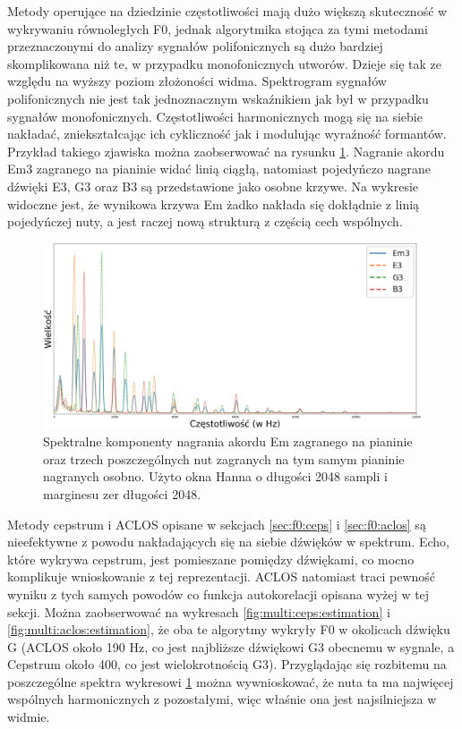 \documentclass[12pt,a4paper,twoside]{mwart}
\begin{document}
Metody operujące na dziedzinie częstotliwości mają dużo większą skuteczność w wykrywaniu równoległych F0, jednak algorytmika stojąca za tymi metodami przeznaczonymi do analizy sygnałów polifonicznych są dużo bardziej skomplikowana niż te, w przypadku monofonicznych utworów. Dzieje się tak ze względu na wyższy poziom złożoności widma. Spektrogram sygnałów polifonicznych nie jest tak jednoznacznym wskaźnikiem jak był w przypadku sygnałów monofonicznych. Częstotliwości harmonicznych mogą się na siebie nakładać, zniekształcając ich cykliczność jak i modulując wyraźność formantów.  Przykład takiego zjawiska można zaobserwować na rysunku \ref{fig:multi:spectra:partials}. Nagranie akordu Em3 zagranego na pianinie widać linią ciągłą, natomiast pojedyńczo nagrane dźwięki E3, G3 oraz B3 są przedstawione jako osobne krzywe. Na wykresie widoczne jest, że wynikowa krzywa Em żadko nakłada się dokłądnie z linią pojedyńczej nuty, a jest raczej nową strukturą z częścią cech wspólnych.

\begin{figure}[H]
  \begin{center}
    \includegraphics[scale=0.325]{images/Em/spectral_component_em3_partials_2048_512_cropped.png}
    \caption{Spektralne komponenty nagrania akordu Em zagranego na pianinie oraz trzech poszczególnych nut zagranych na tym samym pianinie nagranych osobno. Użyto okna Hanna o długości 2048 sampli i marginesu zer długości 2048.}
    \label{fig:multi:spectra:partials}
  \end{center}
\end{figure}

Metody cepstrum i ACLOS opisane w sekcjach \ref{sec:f0:ceps} i \ref{sec:f0:aclos} są nieefektywne z powodu nakładających się na siebie dźwięków w spektrum. Echo, które wykrywa cepstrum, jest pomieszane pomiędzy dźwiękami, co mocno komplikuje wnioskowanie z tej reprezentacji. ACLOS natomiast traci pewność wyniku z tych samych powodów co funkcja autokorelacji opisana wyżej w tej sekcji. Można zaobserwować na wykresach \ref{fig:multi:ceps:estimation} i \ref{fig:multi:aclos:estimation}, że oba te algorytmy wykryły F0 w okolicach dźwięku G (ACLOS około 190 Hz, co jest najbliższe dźwiękowi G3 obecnemu w sygnale, a Cepstrum około 400, co jest wielokrotnością G3). Przyglądając się rozbitemu na poszczególne spektra wykresowi \ref{fig:multi:spectra:partials} można wywnioskować, że nuta ta ma najwięcej wspólnych harmonicznych z pozostałymi, więc właśnie ona jest najsilniejsza w widmie.
\end{document}
